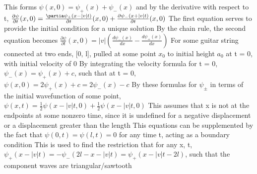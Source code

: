 \documentclass[11 pt, twoside]{article}
\newenvironment{outline*}
{
	\begin{outline}[enumerate]
	}
	{\end{outline}
}
\begin{document}
\begin{outline*}
\3 This forms $\psi(x, 0) = \psi_+(x) + \psi_-(x)$ and by the derivative with respect to t, $\frac{\partial \psi}{\partial t}(x, 0) = \frac{\partia \psi_+ (x - |v|t)}{\partial t}(x, 0) + \frac{\partial \psi_- (x + |v|t)}{\partial t}(x, 0)$
\4 The first equation serves to provide the initial condition for a unique solution
\3 By the chain rule, the second equation becomes $\frac{\partial \psi}{\partial t}(x, 0) = |v|(\frac{d\psi_-(x)}{dx} - \frac{d\psi_+(x)}{dx})$
\2 For some guitar string connected at two ends, [0, l], pulled at some point $x_0$ to initial height $a_0$ at t = 0, with initial velocity of 0
\3 By integrating the velocity formula for t = 0, $\psi_-(x) = \psi_+(x) + c$, such that at t = 0, $\psi(x, 0) = 2\psi_+(x) + c = 2\psi_-(x) - c$
\1 By these formulas for $\psi_\pm$ in terms of the initial wavefunction of some point, $\psi(x, t) = \frac{1}{2}\psi(x - |v|t, 0) + \frac{1}{2}\psi(x - |v|t, 0)$
\2 This assumes that x is not at the endpoints at some nonzero time, since it is undefined for a negative displacement or a displacement greater than the length
\2 This equations can be supplemented by the fact that $\psi(0, t) = \psi(l, t) = 0$ for any time t, acting as a boundary condition
\2 This is used to find the restriction that for any x, t, $\psi_+(x - |v|t) = -\psi_-(2l - x - |v|t) = \psi_+(x - |v|t - 2l)$, such that the component waves are triangular/sawtooth
\end{outline*}
\end{document}
